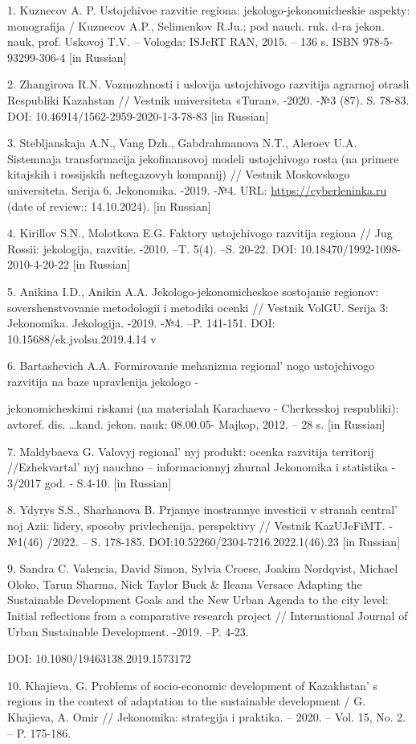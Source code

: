 \begin{references}
1. Kuznecov A. P. Ustojchivoe razvitie regiona: jekologo-jekonomicheskie
aspekty: monografija / Kuznecov A.P., Selimenkov R.Ju.; pod nauch. ruk.
d-ra jekon. nauk, prof. Uskovoj T.V. -- Vologda: ISJeRT RAN, 2015. --
136 s. ISBN 978-5-93299-306-4 {[}in Russian{]}

2. Zhangirova R.N. Vozmozhnosti i uslovija ustojchivogo razvitija
agrarnoj otrasli Respubliki Kazahstan // Vestnik universiteta «Turan».
-2020. -№3 (87). S. 78-83. DOI: 10.46914/1562-2959-2020-1-3-78-83 {[}in
Russian{]}

3. Stebljanskaja A.N., Vang Dzh., Gabdrahmanova N.T., Aleroev U.A.
Sistemnaja transformacija jekofinansovoj modeli ustojchivogo rosta (na
primere kitajskih i rossijskih neftegazovyh kompanij) // Vestnik
Moskovskogo universiteta. Serija 6. Jekonomika. -2019. -№4. URL:
\href{https://cyberleninka.ru/article/n/sistemnaya-transformatsiya-ekofinansovoy-modeli-ustoychivogo-rosta-na-primere-kitayskih-i-rossiyskih-neftegazovyh-kompaniy}{https://cyberleninka.ru}
(date of review:: 14.10.2024). {[}in Russian{]}

4. Kirillov S.N., Molotkova E.G. Faktory ustojchivogo razvitija regiona
// Jug Rossii: jekologija, razvitie. -2010. --T. 5(4). --S. 20-22. DOI:
10.18470/1992-1098-2010-4-20-22 {[}in Russian{]}

5. Anikina I.D., Anikin A.A. Jekologo-jekonomicheskoe sostojanie
regionov: sovershenstvovanie metodologii i metodiki ocenki // Vestnik
VolGU. Serija 3: Jekonomika. Jekologija. -2019. -№4. --P. 141-151. DOI:
10.15688/ek.jvolsu.2019.4.14 v

6. Bartashevich A.A. Formirovanie mehanizma
regional' nogo ustojchivogo razvitija na baze upravlenija
jekologo -

jekonomicheskimi riskami (na materialah Karachaevo -
Cherkesskoj respubliki): avtoref. dis. \ldots kand. jekon. nauk:
08.00.05- Majkop, 2012. -- 28 s. {[}in Russian{]}

7. Maldybaeva G. Valovyj regional' nyj produkt: ocenka
razvitija territorij //Ezhekvartal' nyj nauchno --
informacionnyj zhurnal Jekonomika i statistika - 3/2017 god. - S.4-10.
{[}in Russian{]}

8. Ydyrys S.S., Sharhanova B. Prjamye inostrannye investicii v stranah
central' noj Azii: lidery, sposoby privlechenija,
perspektivy // Vestnik KazUJeFiMT. -№1(46) /2022. -- S. 178-185.
DOI:10.52260/2304-7216.2022.1(46).23 {[}in Russian{]}

9. Sandra C. Valencia, David Simon, Sylvia Croese, Joakim Nordqvist,
Michael Oloko, Tarun Sharma, Nick Taylor Buck \& Ileana Versace Adapting
the Sustainable Development Goals and the New Urban Agenda to the city
level: Initial reflections from a comparative research project //
International Journal of Urban Sustainable Development. -2019. --P.
4-23.

DOI: 10.1080/19463138.2019.1573172

10. Khajieva, G. Problems of socio-economic development of
Kazakhstan' s regions in the context of adaptation to the
sustainable development / G. Khajieva, A. Omir // Jekonomika: strategija
i praktika. -- 2020. -- Vol. 15, No. 2. -- P. 175-186.
\end{references}

